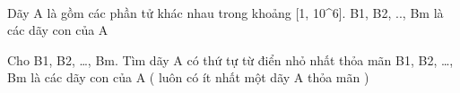  

Dãy A là gồm các phần tử khác nhau trong khoảng [1, 10^6]. B1, B2, .., Bm là các dãy con của A

Cho B1, B2, …, Bm. Tìm dãy A có thứ tự từ điển nhỏ nhất thỏa mãn B1, B2, …, Bm là các dãy con của A ( luôn có ít nhất một dãy A thỏa mãn )

\